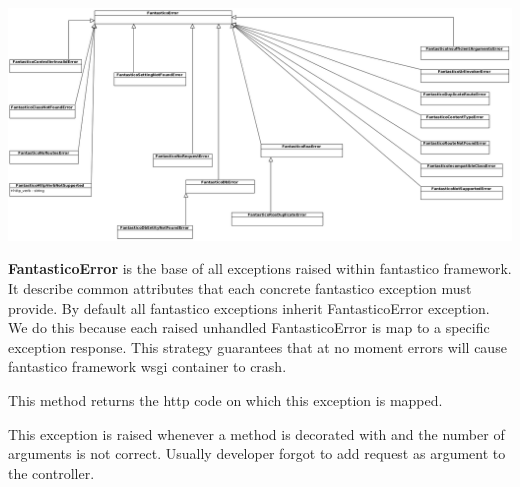 \documentclass[letterpaper,10pt,english]{sphinxmanual}
\begin{document}
\begin{fulllineitems}
\label{features/exceptions:fantastico.exceptions.FantasticoError}~
\includegraphics{exceptions.png}

\textbf{FantasticoError} is the base of all exceptions raised within fantastico framework. It describe common attributes that
each concrete fantastico exception must provide. By default all fantastico exceptions inherit FantasticoError exception.
We do this because each raised unhandled FantasticoError is map to a specific exception response. This strategy guarantees
that at no moment errors will cause fantastico framework wsgi container to crash.

\begin{fulllineitems}
\label{features/exceptions:fantastico.exceptions.FantasticoError.http_code}
This method returns the http code on which this exception is mapped.

\end{fulllineitems}


\end{fulllineitems}


\begin{fulllineitems}
\label{features/exceptions:fantastico.exceptions.FantasticoControllerInvalidError}
This exception is raised whenever a method is decorated with
{\hyperref[features/mvc:fantastico.mvc.controller_decorators.Controller]{}} and the number of arguments is not correct. Usually
developer forgot to add request as argument to the controller.

\end{fulllineitems}
\end{document}
